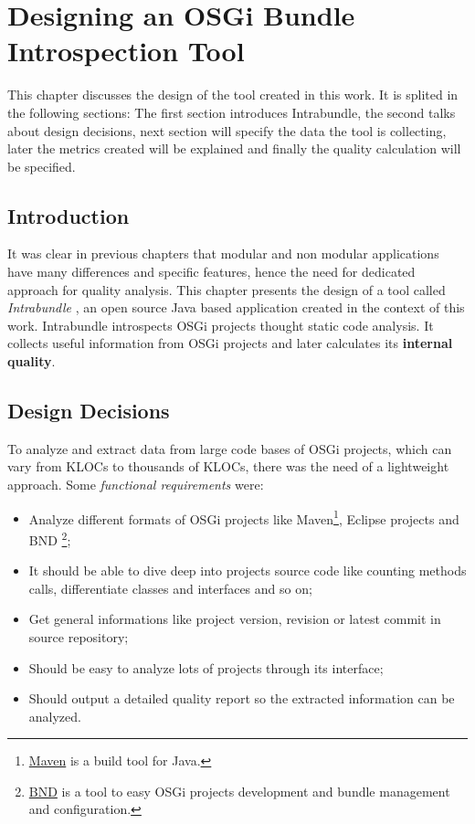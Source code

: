 \chapter{Designing an OSGi Bundle Introspection Tool}
This chapter discusses the design of the tool created in this work. It is splited in the following sections: The first section introduces Intrabundle, the second talks about design decisions, next section will specify the data the tool is collecting, later the metrics created will be explained and finally the quality calculation will be specified.


\section{Introduction}
\label{ch03:intro}
It was clear in previous chapters that modular and non modular applications have many differences and specific features, hence the need for dedicated approach for quality analysis. This chapter presents the design of a tool called \emph{Intrabundle} \citep{intrabundle github 2014}, an open source Java based application created in the context of this work. Intrabundle introspects OSGi projects thought static code analysis. It collects useful information from OSGi projects and later calculates its \textbf{internal quality}.  


\section{Design Decisions}
\label{ch03:decisions}
To analyze and extract data from large code bases of OSGi projects, which can vary from KLOCs to thousands of KLOCs, there was the need of a lightweight approach. Some \emph{functional requirements} were:

\begin{itemize}
\item Analyze different formats of OSGi projects like Maven\footnote{\href{http://maven.apache.org/index.html}{Maven} is a build tool for Java.}, Eclipse projects and BND \footnote{\href{http://bndtools.org/}{BND} is a tool to easy OSGi projects development and bundle management and configuration.}; 
\item It should be able to dive deep into projects source code like counting methods calls, differentiate classes and interfaces and so on;  
\item Get general informations like project version, revision or latest commit in source repository;
\item Should be easy to analyze lots of projects through its interface;
\item Should output a detailed quality report so the extracted information can be analyzed.
\end{itemize}


